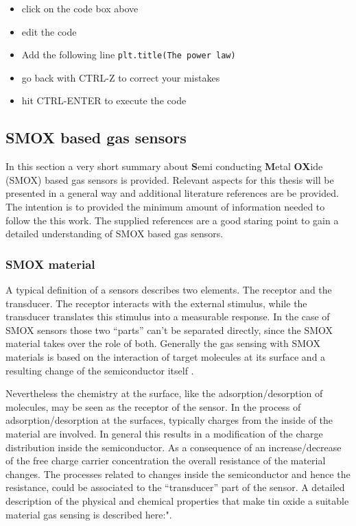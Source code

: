\documentclass[11pt]{article}
\providecommand{\tightlist}{%
      \setlength{\itemsep}{0pt}\setlength{\parskip}{0pt}}
\begin{document}
\begin{itemize}
\tightlist
\item
  click on the code box above
\item
  edit the code
\item
  Add the following line
  \texttt{plt.title(\textquotesingle{}The\ power\ law\textquotesingle{})}
\item
  go back with CTRL-Z to correct your mistakes
\item
  hit CTRL-ENTER to execute the code
\end{itemize}

    \hypertarget{smox-based-gas-sensors}{%
\subsection{SMOX based gas sensors}\label{smox-based-gas-sensors}}

In this section a very short summary about \textbf{S}emi conducting
\textbf{M}etal \textbf{OX}ide (SMOX) based gas sensors is provided.
Relevant aspects for this thesis will be presented in a general way and
additional literature references are be provided. The intention is to
provided the minimum amount of information needed to follow the this
work. The supplied references are a good staring point to gain a
detailed understanding of SMOX based gas sensors.

\hypertarget{smox-material}{%
\subsubsection{SMOX material}\label{smox-material}}

A typical definition of a sensors describes two elements. The receptor
and the transducer. The receptor interacts with the external stimulus,
while the transducer translates this stimulus into a measurable
response. In the case of SMOX sensors those two ``parts'' can't be
separated directly, since the SMOX material takes over the role of both.
Generally the gas sensing with SMOX materials is based on the
interaction of target molecules at its surface and a resulting change of
the semiconductor itself \cite{Barsan2003}.

Nevertheless the chemistry at the surface, like the
adsorption/desorption of molecules, may be seen as the receptor of the
sensor. In the process of adsorption/desorption at the surfaces,
typically charges from the inside of the material are involved. In
general this results in a modification of the charge distribution inside
the semiconductor. As a consequence of an increase/decrease of the free
charge carrier concentration the overall resistance of the material
changes. The processes related to changes inside the semiconductor and
hence the resistance, could be associated to the ``transducer'' part of
the sensor. A detailed description of the physical and chemical
properties that make tin oxide a suitable material gas sensing is
described here:"\cite{Batzill2005}.
\end{document}
